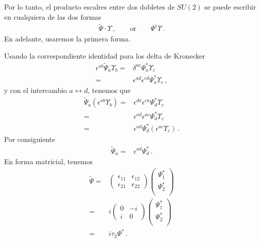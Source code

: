 \begin{frame}
Por lo tanto, el producto escalres entre dos dobletes de $SU(2)$ se puede escribir en cualquiera de las dos formas
\begin{align}
  \widetilde{\Psi}\cdot \Upsilon\,, \qquad\text{or}   \qquad \Psi^{\dagger}\Upsilon\,.
\end{align}
En adelante, usaremos la primera forma.


Usando la correspondiente identidad para los delta de Kronecker
\begin{align}
   \epsilon^{ab}\widetilde{\Psi}_{a} \Upsilon_{b} =&\delta^{ac}\Psi_a^{*}\Upsilon_c \nonumber\\
                                     =&\epsilon^{ad}\epsilon^{cd}\Psi_a^{*}\Upsilon_c \,,
 \end{align}
y con el intercambio $a\leftrightarrow d$, tenemos que
\begin{align}
  \widetilde{\Psi}_{a} \left( \epsilon^{ab}\Upsilon_{b}\right)=&\epsilon^{da}\epsilon^{ca}\Psi_d^{*}\Upsilon_c \nonumber\\
=&\epsilon^{ad}\epsilon^{ac}\Psi_d^{*}\Upsilon_c \nonumber\\
=&\epsilon^{ad}\Psi_d^{*}\left( \epsilon^{ac}\Upsilon_c \right)\,.
\end{align}
Por consiguiente
\begin{align}
\widetilde{\Psi}_a=& \epsilon^{ad}\Psi_d^{*} \,.
\end{align}
En forma matricial, tenemos
\begin{align}
     \widetilde{\Psi}=&\begin{pmatrix} 
                  \epsilon_{11} & \epsilon_{12}\\
                 \epsilon_{21} & \epsilon_{22}
               \end{pmatrix}
               \begin{pmatrix}
                 \Psi_1^{*}\\
                 \Psi_2^{*}\\
               \end{pmatrix}\nonumber\\
               =&i\begin{pmatrix}
                 0 & -i\\
                 i & 0
               \end{pmatrix}
               \begin{pmatrix}
                 \Psi_1^{*}\\
                 \Psi_2^{*}\\
               \end{pmatrix}\nonumber\\
             =&i \tau_2 \Psi^{*}\,.
\end{align}

\end{frame}


